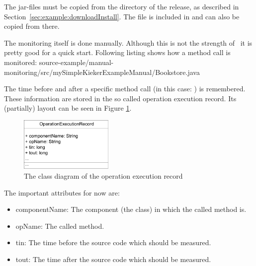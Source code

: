 The \Kieker{} jar-files must be copied from the  directory %
of the \Kieker{} release, as described in Section~\ref{sec:example:downloadInstall}. %
The file  is included in  %
and can also be copied from there.

The monitoring itself is done manually. Although this is not the strength of \Kieker\ it is pretty good for a quick start. Following listing shows how a method call is monitored:
\setJavaCodeListing
%
{source-example/manual-monitoring/src/mySimpleKiekerExampleManual/Bookstore.java}
 
The time before and after a specific method call (in this case: ) is remembered. These information are stored in the so called operation execution record. Its (partially) layout can be seen in Figure \ref{Figure:OperationExecutionRecordClassDiagram}.

\begin{figure}[H]
\begin{centering}
\includegraphics[width=0.4\textwidth]{images/OpExRecClassDiagram}
\caption{The class diagram of the operation execution record}
\label{Figure:OperationExecutionRecordClassDiagram}
\end{centering}
\end{figure}

The important attributes for now are:
\begin{itemize}
\item componentName: The component (the class) in which the called method is.
\item opName: The called method.
\item tin: The time before the source code which should be measured.
\item tout: The time after the source code which should be measured.
\end{itemize}

